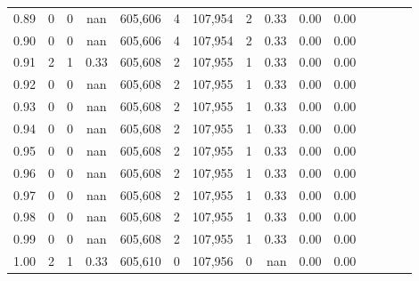 \begin{tabular}{rrrcrrrrrrrrrrr}
0.89 &       0 &      0 &                                        nan &  605,606 &        4 &  107,954 &        2 &  0.33 &  0.00 &                         0.00 \\
0.90 &       0 &      0 &                                        nan &  605,606 &        4 &  107,954 &        2 &  0.33 &  0.00 &                         0.00 \\
0.91 &       2 &      1 &                                       0.33 &  605,608 &        2 &  107,955 &        1 &  0.33 &  0.00 &                         0.00 \\
0.92 &       0 &      0 &                                        nan &  605,608 &        2 &  107,955 &        1 &  0.33 &  0.00 &                         0.00 \\
0.93 &       0 &      0 &                                        nan &  605,608 &        2 &  107,955 &        1 &  0.33 &  0.00 &                         0.00 \\
0.94 &       0 &      0 &                                        nan &  605,608 &        2 &  107,955 &        1 &  0.33 &  0.00 &                         0.00 \\
0.95 &       0 &      0 &                                        nan &  605,608 &        2 &  107,955 &        1 &  0.33 &  0.00 &                         0.00 \\
0.96 &       0 &      0 &                                        nan &  605,608 &        2 &  107,955 &        1 &  0.33 &  0.00 &                         0.00 \\
0.97 &       0 &      0 &                                        nan &  605,608 &        2 &  107,955 &        1 &  0.33 &  0.00 &                         0.00 \\
0.98 &       0 &      0 &                                        nan &  605,608 &        2 &  107,955 &        1 &  0.33 &  0.00 &                         0.00 \\
0.99 &       0 &      0 &                                        nan &  605,608 &        2 &  107,955 &        1 &  0.33 &  0.00 &                         0.00 \\
1.00 &       2 &      1 &                                       0.33 &  605,610 &        0 &  107,956 &        0 &   nan &  0.00 &                         0.00 \\
\bottomrule
\end{tabular}
